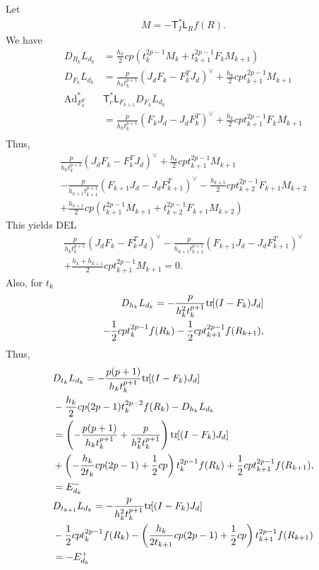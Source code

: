 \documentclass[letterpaper, 10pt, conference]{ieeeconf}
\newcommand{\bracket}[1]{\ensuremath{\left[ #1 \right]}}
\newcommand{\parenth}[1]{\ensuremath{\left( #1 \right)}}
\newcommand{\tr}[1]{\mbox{tr}\ensuremath{\negthickspace\bracket{#1}}}
\newcommand{\T}{\ensuremath{\mathsf{T}}}
\renewcommand{\L}{\ensuremath{\mathsf{L}}}
\newcommand{\Ad}{\ensuremath{\mathrm{Ad}}}
\begin{document}
Let 
\begin{align*}
    M = -\T^*_I \L_R f(R).
\end{align*}
We have
\begin{align*}
    D_{R_k} L_{d_k} &= \frac{h_k}{2} cp (t_k^{2p-1} M_k + t_{k+1}^{2p-1} F_k M_{k+1})\\
    D_{F_k} L_{d_k} &= \frac{p}{h_k t_k^{p+1}} (J_dF_k -F_k^T J_d)^\vee + \frac{h_k}{2} cpt^{2p-1}_{k+1} M_{k+1} \\
    \Ad^*_{F_k^T} & \T^*_e \L_{F_{k+1}} D_{F_k} L_{d_k}\\
                    & = \frac{p}{h_k t_k^{p+1}} (F_k J_d - J_dF_k^T)^\vee + \frac{h_k}{2} cpt^{2p-1}_{k+1} F_k M_{k+1} \\
\end{align*}
Thus,
\begin{align*}
\frac{p}{h_k t_k^{p+1}} (J_dF_k -F_k^T J_d)^\vee + \frac{h_k}{2} cpt^{2p-1}_{k+1} M_{k+1}\\
-\frac{p}{h_{k+1} t_{k+1}^{p+1}} (F_{k+1} J_d - J_dF_{k+1}^T)^\vee - \frac{h_{k+1}}{2} cpt^{2p-1}_{k+2} F_{k+1} M_{k+2}\\
+ \frac{h_{k+1}}{2} cp (t_{k+1}^{2p-1} M_{k+1} + t_{k+2}^{2p-1} F_{k+1} M_{k+2})
\end{align*}
This yields DEL
\begin{gather}
\frac{p}{h_k t_k^{p+1}} (J_dF_k -F_k^T J_d)^\vee 
-\frac{p}{h_{k+1} t_{k+1}^{p+1}} (F_{k+1} J_d - J_dF_{k+1}^T)^\vee\nonumber \\
+ \frac{h_k+h_{k+1}}{2} cp t_{k+1}^{2p-1} M_{k+1}  =0.
\end{gather}
Also, for $t_k$
\begin{align*}
    D_{h_k} L_{d_k} = -\frac{p}{h_k^2 t_k^{p+1}} \tr{(I-F_k)J_d}\\
    - \frac{1}{2}c p t_k^{2p-1} f(R_k) - \frac{1}{2}c p t_{k+1}^{2p-1} f(R_{k+1}),\\
\end{align*}
Thus,
\begin{align*}
    & D_{t_k} L_{d_k} = -\frac{p(p+1)}{h_k t_k^{p+1}} \tr{(I-F_k)J_d} \\
    &- \frac{h_k}{2}cp(2p-1) t_k^{2p-2} f(R_k)  - D_{h_k} L_{d_k} \\
    & = \parenth{-\frac{p(p+1)}{h_k t_k^{p+1}} + \frac{p}{h_k^2 t_k^{p+1}}} \tr{(I-F_k)J_d} \\
    & + \parenth{- \frac{h_k}{2 t_k}cp(2p-1) 
        + \frac{1}{2}c p} t_k^{2p-1} f(R_k) + \frac{1}{2}c p t_{k+1}^{2p-1} f(R_{k+1}),\\
    & = E^-_{d_k}\\
    & D_{t_{k+1}} L_{d_k} = -\frac{p}{h_k^2 t_k^{p+1}} \tr{(I-F_k)J_d} \\
    & - \frac{1}{2}c p t_k^{2p-1} f(R_k)
- \parenth{\frac{h_k}{2t_{k+1}}cp(2p-1)  + \frac{1}{2}c p}       t_{k+1}^{2p-1}  f(R_{k+1})  \\
    & = - E^+_{d_k}
\end{align*}
\end{document}

